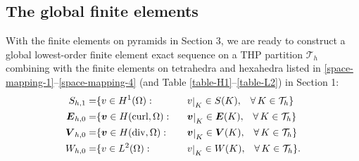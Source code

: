 \documentclass[twoside,reqno,final]{amsart}
\renewcommand{\b}[1]{{\boldsymbol{#1}}}
\def\restrict#1{\raise-0.2ex\hbox{\ensuremath|}_{#1}}
\newcommand{\pol}{\mathbb{P}}
\newcommand{\qol}{\mathbb{Q}}
\begin{document}
\subsection{The global finite elements}
With the finite elements on pyramids in Section 3, we are ready to construct a global 
lowest-order finite element exact sequence on a {\sf THP} partition $\mathcal{T}_h$ combining with the 
finite elements on tetrahedra and hexahedra listed in 
\eqref{space-mapping-1}--\eqref{space-mapping-4} (and Table \ref{table-H1}--\ref{table-L2}) in Section 1:
\begin{alignat*}{4}
  S_{h,1} =&
 \{ v\in H^1(\Omega):
&&\;\;\; v\restrict{K} \in S(K),\;\;\;\forall\, K\in\mathcal{T}_h
\}\\
  \b E_{h,0} =&
 \{\b v\in H(\mathrm{curl},\Omega):
&& \;\;\;\b v\restrict{K} \in \b E(K),\;\;\;\forall\, K\in\mathcal{T}_h
\}\\
  \b V_{h,0} =&
 \{\b v\in H(\mathrm{div},\Omega):
&&\;\;\; \b v\restrict{K} \in \b V(K),\;\;\;\forall\, K\in\mathcal{T}_h
\}\\
  W_{h,0} =&
 \{v\in L^2(\Omega):
&&\;\;\; v\restrict{K} \in W(K),\;\;\;\forall\, K\in\mathcal{T}_h
\}.
\end{alignat*}
\end{document}
